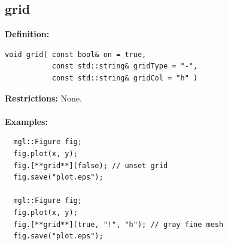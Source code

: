 \documentclass[a4paper]{article}
\newcommand{\command}[1]{\subsection{#1}}
\begin{document}
\command{grid}

\textbf{Definition:}
\begin{lstlisting}
void grid( const bool& on = true, 
           const std::string& gridType = "-", 
           const std::string& gridCol = "h" )
\end{lstlisting}
%
\textbf{Restrictions:} None. \\ \\
%
\textbf{Examples:}
\begin{lstlisting}
  mgl::Figure fig;
  fig.plot(x, y);
  fig.[**grid**](false); // unset grid
  fig.save("plot.eps");

  mgl::Figure fig;
  fig.plot(x, y);
  fig.[**grid**](true, "!", "h"); // gray fine mesh
  fig.save("plot.eps");
\end{lstlisting}
\end{document}
